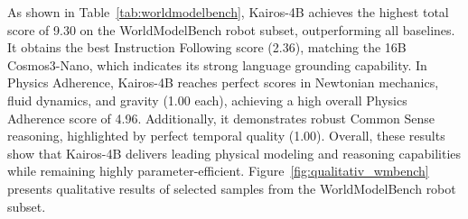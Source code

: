 \documentclass{llmxive}
\begin{document}
As shown in Table~\ref{tab:worldmodelbench}, Kairos-4B achieves the highest total score of 9.30 on the WorldModelBench robot subset, outperforming all baselines. It obtains the best Instruction Following score (2.36), matching the 16B Cosmos3-Nano, which indicates its strong language grounding capability. In Physics Adherence, Kairos-4B reaches perfect scores in Newtonian mechanics, fluid dynamics, and gravity (1.00 each), achieving a high overall Physics Adherence score of 4.96. Additionally, it demonstrates robust Common Sense reasoning, highlighted by perfect temporal quality (1.00). Overall, these results show that Kairos-4B delivers leading physical modeling and reasoning capabilities while remaining highly parameter-efficient.  Figure~\ref{fig:qualitativ_wmbench} presents qualitative results of selected samples from the WorldModelBench robot subset.
\end{document}
